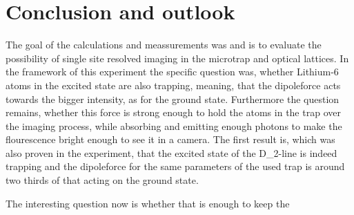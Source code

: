 \chapter{Conclusion and outlook}

The goal of the calculations and meassurements was and is to evaluate the possibility of single site resolved imaging in the microtrap and optical lattices. In the framework of this experiment the specific question was, whether Lithium-6 atoms in the excited state are also trapping, meaning, that the dipoleforce acts towards the bigger intensity, as for the ground state. Furthermore the question remains, whether this force is strong enough to hold the atoms in the trap over the imaging process, while absorbing and emitting enough photons to make the flourescence bright enough to see it in a camera. The first result is, which was also proven in the experiment, that the excited state of the D_2-line is indeed trapping and the dipoleforce for the same parameters of the used trap is around two thirds of that acting on the ground state.

The interesting question now is whether that is enough to keep the 